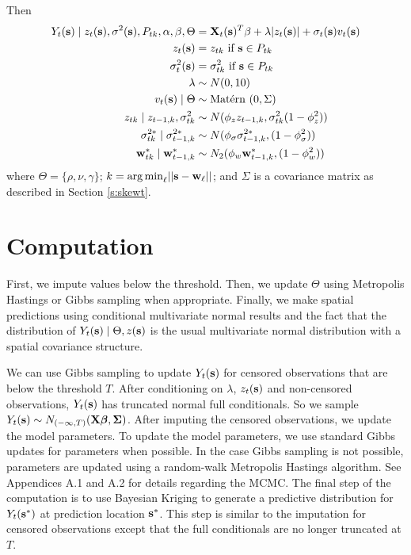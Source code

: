 \documentclass[11pt]{article}
\begin{document}
Then
\begin{align}
   Y_t(\mbox{\bf s}) \mid z_{t}(\mbox{\bf s}), \sigma^2(\mbox{\bf s}), P_{tk}, \alpha, \beta, \Theta &= \mbox{\bf X}_t(\mbox{\bf s})^T \beta + \lambda |z_t(\mbox{\bf s})| + \sigma_t(\mbox{\bf s}) v_t(\mbox{\bf s}) \label{eq:hier}\\
   z_t(\mbox{\bf s}) &= z_{tk} \text{ if } \mbox{\bf s} \in P_{tk}\\
   \sigma^2_{t}(\mbox{\bf s}) &= \sigma^2_{tk} \text{ if } \mbox{\bf s} \in P_{tk}\\
   \lambda &\sim N(0, 10)\\
   v_t(\mbox{\bf s}) \mid \Theta &\sim \mbox{Mat$\acute{\mbox{e}}$rn }(0, \Sigma)\\
   z_{tk} \mid z_{t-1, k}, \sigma^2_{tk} &\sim N(\phi_z z_{t-1, k}, \sigma^2_{tk} (1 - \phi_z^2))\\
   \sigma^{2*}_{tk} \mid \sigma^{2*}_{t-1, k} &\sim N(\phi_\sigma \sigma^{2*}_{t-1, k}, (1 - \phi_\sigma^2))\\
   \mbox{\bf w}^*_{tk} \mid \mbox{\bf w}^*_{t-1, k} &\sim N_2(\phi_w \mbox{\bf w}^*_{t-1, k}, (1 - \phi_w^2))
\end{align}
where $\Theta = \{\rho, \nu, \gamma\}$; \mbox{$k = {\mathop{\rm arg\, min}}_\ell ||\mbox{\bf s} - \mbox{\bf w}_\ell ||$}; and $\Sigma$ is a \Matern covariance matrix as described in Section \ref{s:skewt}.

\section{Computation}\label{s:comp}
First, we impute values below the threshold.
Then, we update $\Theta$ using Metropolis Hastings or Gibbs sampling when appropriate.
Finally, we make spatial predictions using conditional multivariate normal results and the fact that the distribution of $Y_t(\mbox{\bf s}) \mid \Theta, z(\mbox{\bf s})$ is the usual multivariate normal distribution with a \Matern spatial covariance structure.

We can use Gibbs sampling to update $Y_t(\mbox{\bf s})$ for censored observations that are below the threshold $T$.
After conditioning on $\lambda$, $z_t(\mbox{\bf s})$ and non-censored observations, $Y_t(\mbox{\bf s})$ has truncated normal full conditionals.
So we sample $Y_t(\mbox{\bf s}) \sim N_{(-\infty, T)}(\mbox{\bf X} \mbox{\boldmath $\beta$}, \mbox{\boldmath $\Sigma$})$.
After imputing the censored observations, we update the model parameters.
To update the model parameters, we use standard Gibbs updates for parameters when possible.
In the case Gibbs sampling is not possible, parameters are updated using a random-walk Metropolis Hastings algorithm.
See Appendices A.1 and A.2 for details regarding the MCMC.
The final step of the computation is to use Bayesian Kriging to generate a predictive distribution for $Y_t(\mbox{\bf s}^*)$ at prediction location $\mbox{\bf s}^*$.
This step is similar to the imputation for censored observations except that the full conditionals are no longer truncated at $T$.
\end{document}
